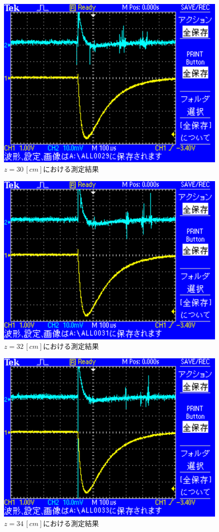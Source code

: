 \begin{figure}[H]
    \centering
    \includegraphics[scale=0.5]{images-16.pdf}
    \caption{$z=30\,[cm]$における測定結果}
\end{figure}

\begin{figure}[H]
    \centering
    \includegraphics[scale=0.5]{images-17.pdf}
    \caption{$z=32\,[cm]$における測定結果}
\end{figure}

\begin{figure}[H]
    \centering
    \includegraphics[scale=0.5]{images-18.pdf}
    \caption{$z=34\,[cm]$における測定結果}
\end{figure}